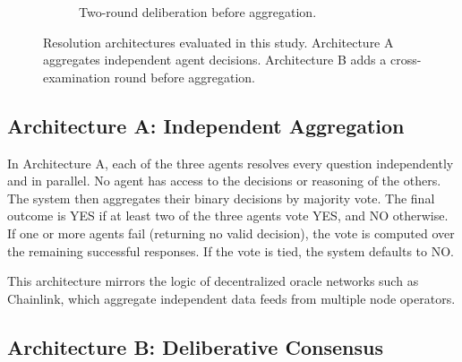 \begin{figure}[t]
\begin{subfigure}[t]{0.48\textwidth}
{
}%
\caption{Two-round deliberation before aggregation.}
\label{fig:archB-diagram}
\end{subfigure}

\caption{Resolution architectures evaluated in this study. Architecture A aggregates independent agent decisions. Architecture B adds a cross-examination round before aggregation.}
\label{fig:archA-archB-panels}
\end{figure}

\subsection{Architecture A: Independent Aggregation}

In Architecture A, each of the three agents resolves every question independently and in parallel. No agent has access to the decisions or reasoning of the others. The system then aggregates their binary decisions by majority vote. The final outcome is YES if at least two of the three agents vote YES, and NO otherwise. If one or more agents fail (returning no valid decision), the vote is computed over the remaining successful responses. If the vote is tied, the system defaults to NO.

This architecture mirrors the logic of decentralized oracle networks such as Chainlink, which aggregate independent data feeds from multiple node operators.

\subsection{Architecture B: Deliberative Consensus}

